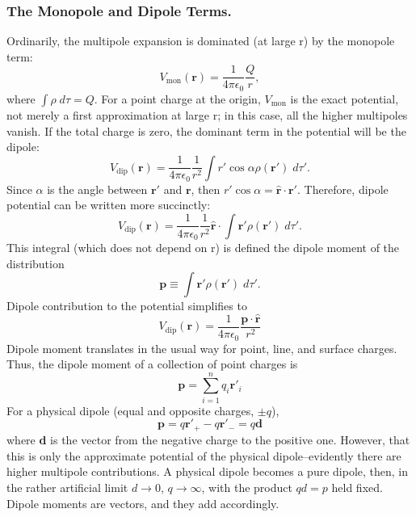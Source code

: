 \documentclass[../../../main.tex]{subfiles}
\begin{document}
\subsubsection{The Monopole and Dipole Terms.} Ordinarily, the multipole expansion is dominated (at large r) by the monopole
term:
\begin{equation*}
     V_{\text{mon}}(\mathbf{r})=\frac{1}{4\pi \epsilon_0}\frac{Q}{r},
\end{equation*}
where $\int\rho\; d\tau=Q$. For a point charge at the origin, $ V_{\text{mon}}$ is the exact potential, not merely a first approximation at large r; in this case, all the higher multipoles vanish. If the total charge is zero, the dominant term in the potential will be the dipole:
\begin{equation*}
     V_{\text{dip}}(\mathbf{r})=\frac{1}{4\pi \epsilon_0}\frac{1}{r^2}\int r'\cos \alpha \rho(\mathbf{r}')\; d\tau'.
\end{equation*}
Since $\alpha$ is the angle between $\mathbf{r'}$ and $\mathbf{r}$, then $r' \cos \alpha = \mathbf{\hat{r}} \cdot \mathbf{r'}$. Therefore, dipole potential can be written more succinctly:
\begin{equation*}
     V_{\text{dip}}(\mathbf{r})=\frac{1}{4\pi \epsilon_0}\frac{1}{r^2}\mathbf{\hat{r}}\cdot\int \mathbf{r'} \rho(\mathbf{r}')\; d\tau'.
\end{equation*}
This integral (which does not depend on r) is defined the dipole moment of the distribution
\begin{equation*}
    \mathbf{p}\equiv \int\mathbf{r'} \rho(\mathbf{r}')\; d\tau'.
\end{equation*}
Dipole contribution to the potential simplifies to
\begin{equation*}
     V_{\text{dip}}(\mathbf{r})=\frac{1}{4\pi \epsilon_0}\frac{\mathbf{p}\cdot \mathbf{\hat{r}}}{r^2}
\end{equation*}
Dipole moment translates in the usual way for point, line, and surface charges. Thus, the dipole moment of a collection of point charges is
\begin{equation*}
    \mathbf{p}=\sum_{i=1}^{n}q_i\mathbf{r'}_i
\end{equation*}
For a physical dipole (equal and opposite charges, $\pm q$),
\begin{equation*}
    \mathbf{p}=q\mathbf{r'}_+-q\mathbf{r'}_-=q\mathbf{d}
\end{equation*}
where \textbf{d} is the vector from the negative charge to the positive one. However, that this is only the approximate potential of the physical dipole--evidently there are higher multipole contributions. A physical dipole becomes a pure dipole, then, in the rather artificial limit $d \rightarrow0$, $q\rightarrow \infty$, with the product $qd = p$ held fixed. Dipole moments are vectors, and they add accordingly.
\end{document}

